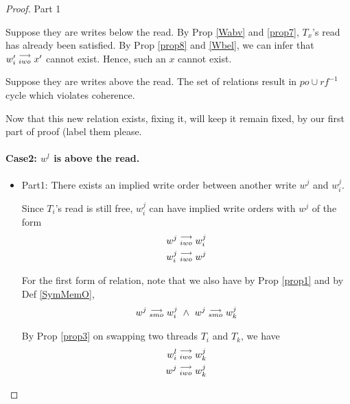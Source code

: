 \begin{proof}{Part 1}
\begin{itemize}
                        Suppose they are writes below the read. 
                        By Prop \ref{Wabv} and \ref{prop7}, $T_x$'s read has already been satisfied. By Prop \ref{prop8} and \ref{Wbel}, we can infer that $w'_i\stackrel{\longrightarrow}{_{iwo}}x'$ cannot exist. Hence, such an $x$ cannot exist.
                        
                        Suppose they are writes above the read.
                        The set of relations result in $po \cup rf^{-1}$ cycle which violates coherence.  


                \end{itemize}
                    Now that this new relation exists, fixing it, will keep it remain fixed, by our first part of proof (label them please. 
                    
            
            \paragraph{Case2: $w^l$ is above the read.}
                
                \begin{itemize}
                    \item Part1: There exists an implied write order between another write $w^j$ and $w_i^j$.

                        Since $T_i$'s read is still free, $w_i^j$ can have implied write orders with $w^j$ of the form
                        \begin{align*}
                            w^j\stackrel{\longrightarrow}{_{iwo}}w_i^j \\
                            w_i^j\stackrel{\longrightarrow}{_{iwo}}w^j 
                        \end{align*}

                        For the first form of relation, note that we also have by Prop \ref{prop1} and by Def \ref{SymMemO}, 
                        \begin{align*}
                            \reln{w^j}{smo}{w_i^j} \ \wedge \ \reln{w^j}{smo}{w_k^j}
                        \end{align*}

                        By Prop \ref{prop3} on swapping two threads $T_i$ and $T_k$, we have 
                        \begin{align*}
                            w_i^l\stackrel{\longrightarrow}{_{iwo}}w_k^j \\
                            w^j\stackrel{\longrightarrow}{_{iwo}}w_k^j
                        \end{align*}


\end{itemize}
\end{proof}
